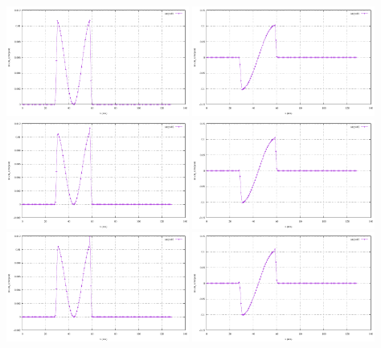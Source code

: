 \begin{center}
\includegraphics[width=6cm]{python_codes/fieldstone_54/images/exp7/n_dov_v_nx_001.pdf}
\includegraphics[width=6cm]{python_codes/fieldstone_54/images/exp7/n_dov_v_ny_001.pdf}\\
\includegraphics[width=6cm]{python_codes/fieldstone_54/images/exp7/n_dov_v_nx_002.pdf}
\includegraphics[width=6cm]{python_codes/fieldstone_54/images/exp7/n_dov_v_ny_002.pdf}\\
\includegraphics[width=6cm]{python_codes/fieldstone_54/images/exp7/n_dov_v_nx_003.pdf}
\includegraphics[width=6cm]{python_codes/fieldstone_54/images/exp7/n_dov_v_ny_003.pdf}\\

\end{center}
